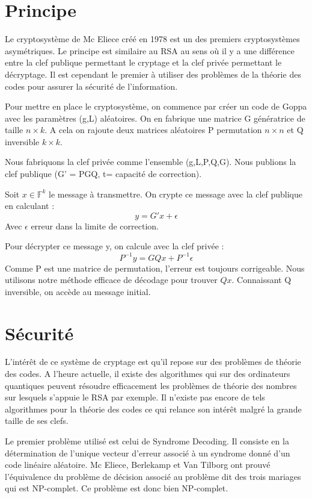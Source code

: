 \documentclass{article}
\begin{document}
		\section*{Principe}
			Le cryptosystème de Mc Eliece créé en 1978 est un des premiers cryptosystèmes asymétriques.
			Le principe est similaire au RSA au sens où il y a une différence entre la clef publique permettant le cryptage et la clef privée permettant le décryptage.
			Il est cependant le premier à utiliser des problèmes de la théorie des codes pour assurer la sécurité de l'information.

			Pour mettre en place le cryptosystème, on commence par créer un code de Goppa avec les paramètres (g,L) aléatoires.
			On en fabrique une matrice G génératrice de taille $n\times k$.
			A cela on rajoute deux matrices aléatoires P permutation $n\times n$ et Q inversible $k \times k$.

			Nous fabriquons la clef privée comme l'ensemble (g,L,P,Q,G).
			Nous publions la clef publique (G' = PGQ, t= capacité de correction).

			Soit $x\in \mathbb{F}^{k}$ le message à transmettre.
			On crypte ce message avec la clef publique en calculant :
			$$
				y = G'x + \epsilon
			$$
			Avec $\epsilon$ erreur dans la limite de correction.

			Pour décrypter ce message y, on calcule avec la clef privée :
			$$
				P^{-1}y = GQx + P^{-1}\epsilon
			$$
			Comme P est une matrice de permutation, l'erreur est toujours corrigeable.
			Nous utilisons notre méthode efficace de décodage pour trouver $Qx$.
			Connaissant Q inversible, on accède au message initial.


		\section*{Sécurité}
			 \cite{veron}
			 L'intérêt de ce système de cryptage est qu'il repose sur des problèmes de théorie des codes.
			 A l'heure actuelle, il existe des algorithmes qui sur des ordinateurs quantiques peuvent résoudre efficacement les problèmes de théorie des nombres sur lesquels s’appuie le RSA par exemple.
			 Il n'existe pas encore de tels algorithmes pour la théorie des codes ce qui relance son intérêt malgré la grande taille de ses clefs.

			 Le premier problème utilisé est celui de Syndrome Decoding.
			 Il consiste en la détermination de l'unique vecteur d'erreur associé à un syndrome donné d'un code linéaire aléatoire.
			 Mc Eliece, Berlekamp et Van Tilborg ont prouvé l'équivalence du problème de décision associé au problème dit des trois mariages qui est NP-complet.
			 Ce problème est donc bien NP-complet.
\end{document}
